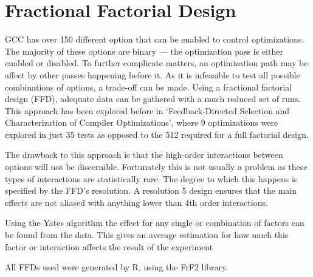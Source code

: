 \documentclass[twocolumn]{article}
\newcommand{\todo}[1]{\textbf{\textcolor{red}{#1}}}
\begin{document}
\section*{Fractional Factorial Design}

GCC has over 150 different option that can be enabled to control optimizations. The majority of these options are binary --- the optimization pass is either enabled or disabled. To further complicate matters, an optimization path may be affect by other passes happening before it. As it is infeasible to test all possible combinations of options, a trade-off can be made. Using a fractional factorial design (FFD), adequate data can be gathered with a much reduced set of runs. This approach has been explored before in `Feedback-Directed Selection and Characterization of Compiler Optimizations'\cite{IntelPaper}, where 9 optimizations were explored in just 35 tests as opposed to the 512 required for a full factorial design.

The drawback to this approach is that the high-order interactions between options will not be discernible. Fortunately this is not usually a problem as these types of interactions are statistically rare\todo{\cite{REF sparsity of effects?}}. The degree to which this happens is specified by the FFD's resolution\cite{BoxHunter}. A resolution 5 design ensures that the main effects are not aliased with anything lower than 4th order interactions.

Using the Yates algorithm the effect for any single or combination of factors can be found from the data. This gives an average estimation for how much this factor or interaction affects the result of the experiment




All FFDs used were generated by R, using the FrF2 library\cite{FrF2}.
\end{document}
